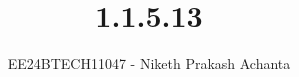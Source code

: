 \documentclass[journal]{IEEEtran}
\begin{document}

\vspace{3cm}

\title{1.1.5.13}
\author{EE24BTECH11047 - Niketh Prakash Achanta
}
{\let\newpage\relax\maketitle}

\renewcommand{\thefigure}{\theenumi}
\renewcommand{\thetable}{\theenumi}
\setlength{\intextsep}{10pt} %

\renewcommand{\thetable}{\theenumi}
\end{document}
